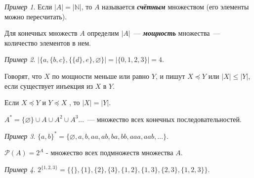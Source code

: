 \documentclass{article}
\theoremstyle{remark}
\newtheorem{example}{Пример}
\begin{document}
\begin{example}
	Если $|A| = |\mathbb{N}|$, то $A$ называется \textbf{\textit{счётным}} множеством (его элементы можно пересчитать).
\end{example}

\begin{definition}
	Для конечных множеств $A$ определим $|A|$~--- \textit{\textbf{мощность}} множества~--- количество элементов в нем.
\end{definition}

\begin{example}
	$|\{a,\{b,c\},\{\{d\},e\},\varnothing\}| = |\{0,1,2,3\}| = 4.$
\end{example}

\begin{definition}
	Говорят, что $X$ по мощности меньше или равно $Y$, и пишут $X \preccurlyeq Y$ или $|X| \leqslant |Y|$, если существует инъекция из $X$ в $ Y $. 
\end{definition}

\begin{theorem}
	Если $X \preccurlyeq Y$ и $Y \preccurlyeq X$ , то $|X| = |Y|$.
\end{theorem}

\begin{definition}
	$A^* = \{\varnothing\} \cup A \cup A^2 \cup A^3 \dotsc$~--- множество всех конечных последовательностей.
\end{definition}

\begin{example}
	$\{a,b\}^* = \{\varnothing, a,b,aa,ab,ba,bb,aaa,aab,\dotsc\}.$
\end{example}

\begin{definition}
	$\mathcal{P}(A) = 2^A$ - множество всех подмножеств множества $A$.
\end{definition}

\begin{example}
	$2^{\{1,2,3\}} = \{\{\}, \{1\},\{2\},\{3\},\{1,2\},\{1,3\},\{2,3\},\{1,2,3\}\}.$
\end{example}
\end{document}
